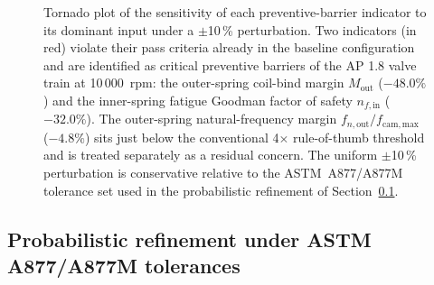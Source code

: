 \begin{figure}[!htbp]
 \centering
 \resizebox{\linewidth}{!}{}
 \caption{Tornado plot of the sensitivity of each preventive-barrier indicator to its dominant input under a $\pm$10\,\% perturbation. Two indicators (in red) violate their pass criteria already in the baseline configuration and are identified as critical preventive barriers of the AP 1.8 valve train at 10\,000~rpm: the outer-spring coil-bind margin $M_{\mathrm{out}}$ ($-48.0\%$) and the inner-spring fatigue Goodman factor of safety $n_{f,\mathrm{in}}$ ($-32.0\%$). The outer-spring natural-frequency margin $f_{n,\mathrm{out}}/f_{\mathrm{cam,max}}$ ($-4.8\%$) sits just below the conventional 4$\times$ rule-of-thumb threshold and is treated separately as a residual concern. The uniform $\pm$10\,\% perturbation is conservative relative to the ASTM~A877/A877M tolerance set used in the probabilistic refinement of Section~\ref{sec:res-mc}.}\label{fig:tornado}
\end{figure}

\subsection{Probabilistic refinement under ASTM A877/A877M tolerances}
\label{sec:res-mc}

